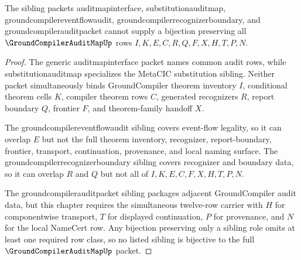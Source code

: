 \begin{theorem}
\label{thm:ground-compiler-audit-map-independence-witness}
The sibling packets auditmapinterface, substitutionauditmap, groundcompilereventflowaudit, groundcompilerrecognizerboundary, and groundcompilerauditpacket cannot supply a bijection preserving all $\GroundCompilerAuditMapUp$ rows $I,K,E,C,R,Q,F,X,H,T,P,N$.
\end{theorem}
\begin{proof}
The generic auditmapinterface packet names common audit rows, while substitutionauditmap specializes the MetaCIC substitution sibling. Neither packet simultaneously binds GroundCompiler theorem inventory $I$, conditional theorem cells $K$, compiler theorem rows $C$, generated recognizers $R$, report boundary $Q$, frontier $F$, and theorem-family handoff $X$.

The groundcompilereventflowaudit sibling covers event-flow legality, so it can overlap $E$ but not the full theorem inventory, recognizer, report-boundary, frontier, transport, continuation, provenance, and local naming surface. The groundcompilerrecognizerboundary sibling covers recognizer and boundary data, so it can overlap $R$ and $Q$ but not all of $I,K,E,C,F,X,H,T,P,N$.

The groundcompilerauditpacket sibling packages adjacent GroundCompiler audit data, but this chapter requires the simultaneous twelve-row carrier with $H$ for componentwise transport, $T$ for displayed continuation, $P$ for provenance, and $N$ for the local NameCert row. Any bijection preserving only a sibling role omits at least one required row class, so no listed sibling is bijective to the full $\GroundCompilerAuditMapUp$ packet.
\end{proof}

